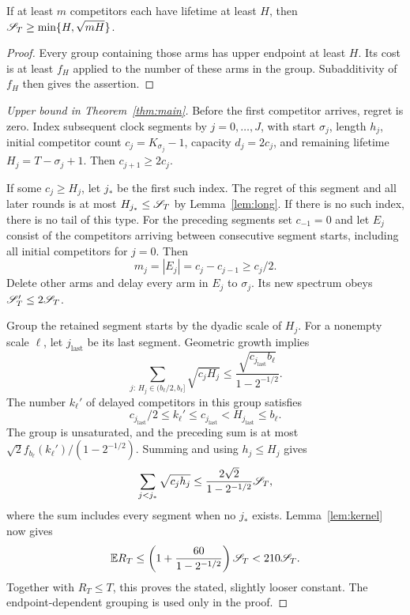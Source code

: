 \begin{lemma}\label{lem:long}
If at least $m$ competitors each have lifetime at least $H$, then $\mathscr S_T\ge\min\{H,\sqrt{mH}\}$.
\end{lemma}
\begin{proof}
Every group containing those arms has upper endpoint at least $H$. Its cost is at least $f_H$ applied to the number of these arms in the group. Subadditivity of $f_H$ then gives the assertion.
\end{proof}

\begin{proof}[Upper bound in Theorem~\ref{thm:main}]
Before the first competitor arrives, regret is zero. Index subsequent clock segments by $j=0,\ldots,J$, with start $\sigma_j$, length $h_j$, initial competitor count $c_j=K_{\sigma_j}-1$, capacity $d_j=2c_j$, and remaining lifetime $H_j=T-\sigma_j+1$. Then $c_{j+1}\ge2c_j$.

If some $c_j\ge H_j$, let $j_*$ be the first such index. The regret of this segment and all later rounds is at most $H_{j_*}\le\mathscr S_T$ by Lemma~\ref{lem:long}. If there is no such index, there is no tail of this type. For the preceding segments set $c_{-1}=0$ and let $E_j$ consist of the competitors arriving between consecutive segment starts, including all initial competitors for $j=0$. Then
\[
 m_j=|E_j|=c_j-c_{j-1}\ge c_j/2.
\]
Delete other arms and delay every arm in $E_j$ to $\sigma_j$. Its new spectrum obeys $\mathscr S_T'\le2\mathscr S_T$.

Group the retained segment starts by the dyadic scale of $H_j$. For a nonempty scale $\ell$, let $j_{\mathrm{last}}$ be its last segment. Geometric growth implies
\[
 \sum_{j:\,H_j\in(b_\ell/2,b_\ell]}\sqrt{c_jH_j}
 \le\frac{\sqrt{c_{j_{\mathrm{last}}}b_\ell}}{1-2^{-1/2}}.
\]
The number $k_\ell'$ of delayed competitors in this group satisfies
\[
 c_{j_{\mathrm{last}}}/2\le k_\ell'\le c_{j_{\mathrm{last}}}
 <H_{j_{\mathrm{last}}}\le b_\ell.
\]
The group is unsaturated, and the preceding sum is at most $\sqrt2 f_{b_\ell}(k_\ell')/(1-2^{-1/2})$. Summing and using $h_j\le H_j$ gives
\[
 \sum_{j<j_*}\sqrt{c_jh_j}
 \le\frac{2\sqrt2}{1-2^{-1/2}}\mathscr S_T,
\]
where the sum includes every segment when no $j_*$ exists. Lemma~\ref{lem:kernel} now gives
\[
 \mathbb E R_T\le\left(1+\frac{60}{1-2^{-1/2}}\right)\mathscr S_T<210\mathscr S_T.
\]
Together with $R_T\le T$, this proves the stated, slightly looser constant. The endpoint-dependent grouping is used only in the proof.
\end{proof}

